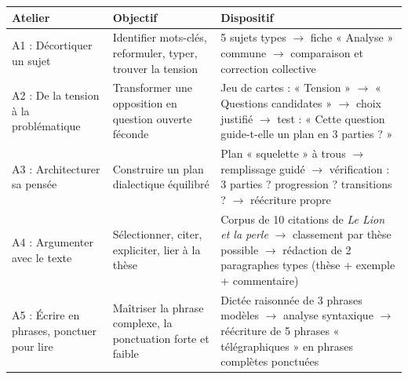 \documentclass[11pt]{article}
\begin{document}
\begin{center}
\begin{tabularx}{\linewidth}{|l|X|X|}\hline
\rowcolor{popblueL}\textbf{Atelier} & \textbf{Objectif} & \textbf{Dispositif} \\ \hline
A1 : Décortiquer un sujet & Identifier mots-clés, reformuler, typer, trouver la tension & 5 sujets types $\rightarrow$ fiche « Analyse » commune $\rightarrow$ comparaison et correction collective \\ \hline
A2 : De la tension à la problématique & Transformer une opposition en question ouverte féconde & Jeu de cartes : « Tension » $\rightarrow$ « Questions candidates » $\rightarrow$ choix justifié $\rightarrow$ test : « Cette question guide-t-elle un plan en 3 parties ? » \\ \hline
A3 : Architecturer sa pensée & Construire un plan dialectique équilibré & Plan « squelette » à trous $\rightarrow$ remplissage guidé $\rightarrow$ vérification : 3 parties ? progression ? transitions ? $\rightarrow$ réécriture propre \\ \hline
A4 : Argumenter avec le texte & Sélectionner, citer, expliciter, lier à la thèse & Corpus de 10 citations de \emph{Le Lion et la perle} $\rightarrow$ classement par thèse possible $\rightarrow$ rédaction de 2 paragraphes types (thèse + exemple + commentaire) \\ \hline
A5 : Écrire en phrases, ponctuer pour lire & Maîtriser la phrase complexe, la ponctuation forte et faible & Dictée raisonnée de 3 phrases modèles $\rightarrow$ analyse syntaxique $\rightarrow$ réécriture de 5 phrases « télégraphiques » en phrases complètes ponctuées \\ \hline
\end{tabularx}
\end{center}
\end{document}
